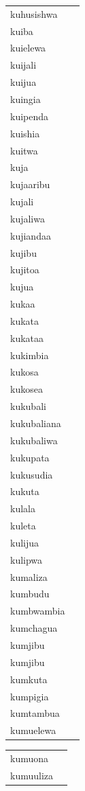 \documentclass[output=paper,colorlinks,citecolor=brown,
]{langscibook}
\begin{document}
\begin{table}
\begin{footnotesize}
\begin{minipage}{.24\textwidth}
\begin{tabular}{llllll}
\end{tabular}
\end{minipage}
\begin{minipage}{.24\textwidth}
\begin{tabular}{ll}
kuhusishwa \\ 
kuiba \\ 
kuielewa \\
kuijali \\ 
kuijua \\ 
kuingia \\ 
kuipenda \\ 
kuishia \\ 
kuitwa \\ 
kuja \\ 
kujaaribu \\ 
kujali \\ 
kujaliwa \\ 
kujiandaa \\ 
kujibu \\ 
kujitoa \\ 
kujua \\ 
kukaa \\ 
kukata \\ 
kukataa \\ 
kukimbia \\ 
kukosa \\ 
kukosea \\ 
kukubali \\ 
kukubaliana \\ 
kukubaliwa \\ 
kukupata \\ 
kukusudia \\ 
kukuta \\ 
kulala \\ 
kuleta \\ 
kulijua \\ 
kulipwa \\ 
kumaliza \\ 
kumbudu \\ 
kumbwambia \\ 
kumchagua \\ 
kumjibu \\ 
kumjibu \\ 
kumkuta \\ 
kumpigia \\ 
kumtambua \\ 
kumuelewa \\ 

\end{tabular}
\end{minipage}
\begin{minipage}{.24\textwidth}
\begin{tabular}{ll}
kumuona \\ 
kumuuliza \\ 


\end{tabular}
\end{minipage}
\end{footnotesize}
\end{table}
\end{document}

